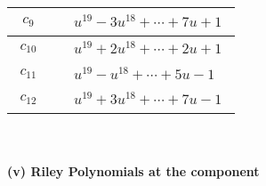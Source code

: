 \documentclass[1p]{elsarticle_modified}
\theoremstyle{definition}
\begin{document}
\begin{tabular}{m{50pt}|m{274pt}}
\hline $$\begin{aligned}c_{9}\end{aligned}$$&$\begin{aligned}
&u^{19}-3 u^{18}+\cdots+7 u+1
\end{aligned}$\\
\hline $$\begin{aligned}c_{10}\end{aligned}$$&$\begin{aligned}
&u^{19}+2 u^{18}+\cdots+2 u+1
\end{aligned}$\\
\hline $$\begin{aligned}c_{11}\end{aligned}$$&$\begin{aligned}
&u^{19}- u^{18}+\cdots+5 u-1
\end{aligned}$\\
\hline $$\begin{aligned}c_{12}\end{aligned}$$&$\begin{aligned}
&u^{19}+3 u^{18}+\cdots+7 u-1
\end{aligned}$\\
\hline
\end{tabular}\\~\\
\newpage\renewcommand{\arraystretch}{1}
\flushleft \textbf{(v) Riley Polynomials at the component}\newline \\
\end{document}
